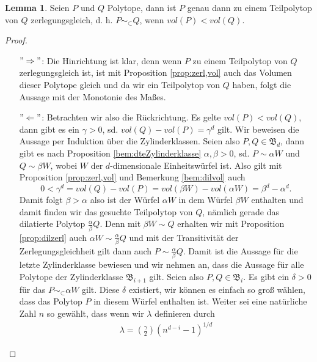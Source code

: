 \documentclass[11pt,titlepage]{article}
\theoremstyle{definition}
\newtheorem{lemma}[theorem]{Lemma}
\theoremstyle{remark}
\begin{document}
	\begin{lemma} \label{lemma:teilzerl}
		Seien $P$ und $Q$ Polytope, dann ist $P$ genau dann zu 
		einem Teilpolytop von $Q$ zerlegungsgleich, d. h. $P\sim_{\subset}Q$, wenn $vol(P)<vol(Q)$.
	\end{lemma}
	
	\begin{proof}
		\noindent
		\begin{itemize}
			\item[$"\Rightarrow"$:] Die Hinrichtung ist klar, denn wenn $P$ zu einem Teilpolytop 
			von $Q$ zerlegungsgleich ist, ist mit 
			Proposition \ref{prop:zerl,vol} auch das Volumen
			dieser Polytope gleich und da wir ein Teilpolytop von $Q$ 
			haben, folgt die Aussage mit der Monotonie des Maßes.
			\item[$"\Leftarrow"$:] Betrachten wir also die Rückrichtung. 
			Es gelte $vol(P)<vol(Q)$, dann gibt es ein $\gamma>0$, sd. 
			$vol(Q)-vol(P)=\gamma^d$ gilt. Wir beweisen die Aussage 
			per Induktion über die Zylinderklassen. Seien also 
			$P,Q\in\mathfrak{B}_d$, dann gibt es nach Proposition 
			\ref{bem:dteZylinderklasse} $\alpha,\beta>0$, sd. 
			$P\sim \alpha W$ und $Q\sim \beta W$, wobei $W$ 
			der $d$-dimensionale Einheitswürfel ist. Also gilt 
			mit Proposition \ref{prop:zerl,vol} und Bemerkung 
			\ref{bem:dilvol} auch
			\[0<\gamma^d =vol(Q)-vol(P)=vol(\beta W)-vol(\alpha W)
			=\beta^d -\alpha^d.\]
			Damit folgt $\beta>\alpha$ also ist der Würfel $\alpha W$ 
			in dem Würfel $\beta W$ enthalten und damit finden wir 
			das gesuchte Teilpolytop von $Q$, nämlich gerade 
			das dilatierte Polytop $\frac{\alpha}{\beta}Q$. Denn 
			mit $\beta W\sim Q$ erhalten wir mit 
			Proposition \ref{prop:dilzerl} auch 
			$\alpha W\sim \frac{\alpha}{\beta}Q$ und mit der 
			Transitivität der Zerlegungsgleichheit 
			gilt dann auch $P\sim \frac{\alpha}{\beta}Q$. Damit ist 
			die Aussage für die letzte Zylinderklasse bewiesen und 
			wir nehmen an, dass die Aussage für alle Polytope 
			der Zylinderklasse $\mathfrak{B}_{i+1}$ gilt. Seien also 
			$P,Q\in\mathfrak{B}_i$. Es gibt ein $\delta>0$ für das 
			$P\sim_{\subset}\alpha W$ gilt. Diese $\delta$ existiert, 
			wir können es einfach so groß wählen, dass das Polytop $P$ 
			in diesem Würfel enthalten ist. Weiter sei eine 
			natürliche Zahl $n$ so gewählt, dass wenn wir $\lambda$ 
			definieren durch
			\begin{align}
				\lambda=\left(\frac{\gamma}{2}\right)(n^{d-i}-1)^{1/d} \label{lemma:teilzerl;6}
			\end{align}

\end{itemize}
\end{proof}
\end{document}
